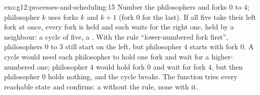 \begin{solution}{exo:g12:processes-and-scheduling:15}
Number the philosophers and forks $0$ to $4$; philosopher $k$ uses forks $k$ and $k + 1$ (fork $0$ for the last).
If all five take their left fork at once, every fork is held and each waits for the right one, held by a neighbour:
a cycle of five, a . With the rule ``lower-numbered fork first'', philosophers $0$ to $3$ still start on the
left, but philosopher $4$ starts with fork $0$. A cycle would need each philosopher to hold one fork and wait for a
higher-numbered one; philosopher $4$ would hold fork $0$ and wait for fork $4$, but then philosopher $0$ holds
nothing, and the cycle breaks. The function  tries every reachable state and confirms: a 
without the rule, none with it.
\end{solution}


